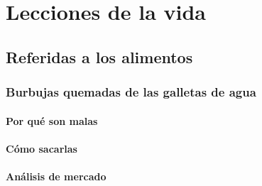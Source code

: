 \chapter{Lecciones de la vida}

\section{Referidas a los alimentos}

\subsection{Burbujas quemadas de las galletas de agua}

\subsubsection{Por qué son malas}

\subsubsection{Cómo sacarlas}

\subsubsection{Análisis de mercado}



